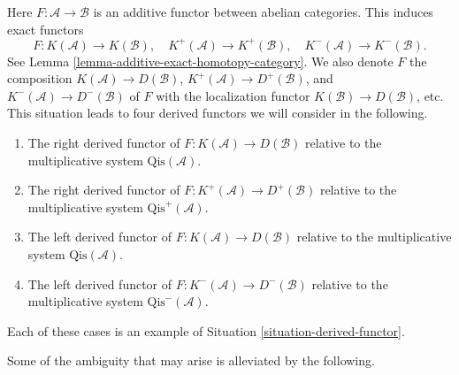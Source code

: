 \begin{situation}
\label{situation-classical}
Here $F : \mathcal{A} \to \mathcal{B}$ is an additive functor between
abelian categories. This induces exact functors
$$
F : K(\mathcal{A}) \to K(\mathcal{B}), \quad
K^{+}(\mathcal{A}) \to K^{+}(\mathcal{B}), \quad
K^{-}(\mathcal{A}) \to K^{-}(\mathcal{B}).
$$
See Lemma \ref{lemma-additive-exact-homotopy-category}.
We also denote $F$ the composition $K(\mathcal{A}) \to D(\mathcal{B})$,
$K^{+}(\mathcal{A}) \to D^{+}(\mathcal{B})$, and
$K^{-}(\mathcal{A}) \to D^-(\mathcal{B})$ of $F$ with the localization
functor $K(\mathcal{B}) \to D(\mathcal{B})$, etc. This situation leads
to four derived functors we will consider in the following.
\begin{enumerate}
\item The right derived functor of
$F : K(\mathcal{A}) \to D(\mathcal{B})$
relative to the multiplicative system $\text{Qis}(\mathcal{A})$.
\item The right derived functor of
$F : K^{+}(\mathcal{A}) \to D^{+}(\mathcal{B})$
relative to the multiplicative system $\text{Qis}^{+}(\mathcal{A})$.
\item The left derived functor of
$F : K(\mathcal{A}) \to D(\mathcal{B})$
relative to the multiplicative system $\text{Qis}(\mathcal{A})$.
\item The left derived functor of
$F : K^{-}(\mathcal{A}) \to D^{-}(\mathcal{B})$
relative to the multiplicative system $\text{Qis}^-(\mathcal{A})$.
\end{enumerate}
Each of these cases is an example of
Situation \ref{situation-derived-functor}.
\end{situation}

\noindent
Some of the ambiguity that may arise is alleviated by the following.

